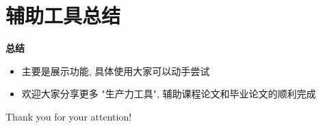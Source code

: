 \documentclass[UTF8]{ctexbeamer}
\begin{document}


\section{辅助工具总结}
\begin{frame}{\textbf{总结}}
    \begin{itemize}
        \item 主要是展示功能, 具体使用大家可以动手尝试
        \item 欢迎大家分享更多 "生产力工具", 辅助课程论文和毕业论文的顺利完成
    \end{itemize}
\end{frame}

\begin{frame}
    \begin{center}
        {\Huge\calligra Thank you for your attention!}
    \end{center}
\end{frame}
\end{document}
